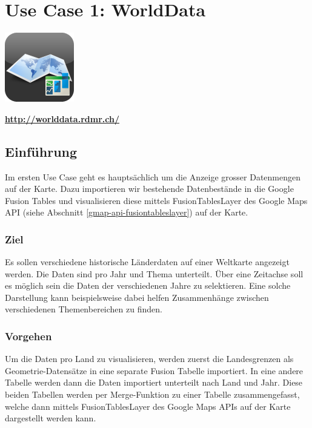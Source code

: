 \chapter{Use Case 1: WorldData}
\label{worlddata}

\begin{center}
\includegraphics[scale=0.8]{images/usecase1-worlddata/worlddata-icon_with_gloss}

{\large \textbf{\url{http://worlddata.rdmr.ch/}}}
\end{center}

\section{Einführung}
Im ersten Use Case geht es hauptsächlich um die Anzeige grosser Datenmengen auf der Karte. Dazu importieren wir bestehende Datenbestände in die Google Fusion Tables und visualisieren diese mittels FusionTablesLayer des Google Maps API (siehe Abschnitt \ref{gmap-api-fusiontableslayer}) auf der Karte.

\subsection{Ziel}
Es sollen verschiedene historische Länderdaten auf einer Weltkarte angezeigt werden. Die Daten sind pro Jahr und Thema unterteilt. Über eine Zeitachse soll es möglich sein die Daten der verschiedenen Jahre zu selektieren. Eine solche Darstellung kann beispielsweise dabei helfen Zusammenhänge zwischen verschiedenen Themenbereichen zu finden.

\subsection{Vorgehen}
Um die Daten pro Land zu visualisieren, werden zuerst die Landesgrenzen als Geometrie-Datensätze in eine separate Fusion Tabelle importiert. In eine andere Tabelle werden dann die Daten importiert unterteilt nach Land und Jahr. Diese beiden Tabellen werden per Merge-Funktion zu einer Tabelle zusammengefasst, welche dann mittels FusionTablesLayer des Google Maps APIs auf der Karte dargestellt werden kann.

